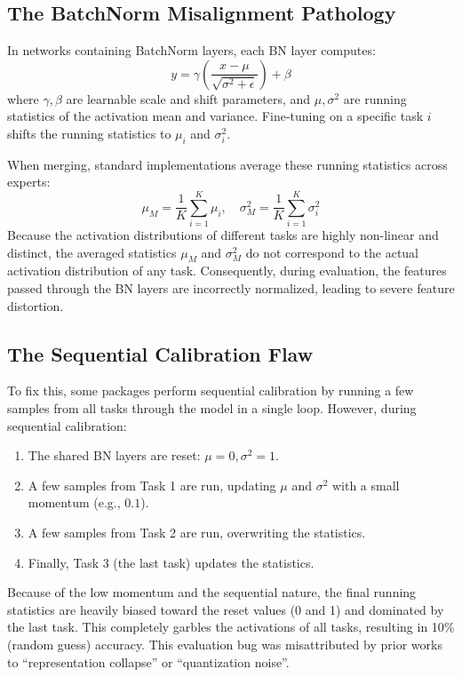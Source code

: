 \documentclass{article}
\theoremstyle{plain}
\theoremstyle{definition}
\theoremstyle{remark}
\begin{document}
\subsection{The BatchNorm Misalignment Pathology}
In networks containing BatchNorm layers, each BN layer computes:
\begin{equation}
    y = \gamma \left(\frac{x - \mu}{\sqrt{\sigma^2 + \epsilon}}\right) + \beta
\end{equation}
where $\gamma, \beta$ are learnable scale and shift parameters, and $\mu, \sigma^2$ are running statistics of the activation mean and variance. Fine-tuning on a specific task $i$ shifts the running statistics to $\mu_i$ and $\sigma^2_i$. 

When merging, standard implementations average these running statistics across experts:
\begin{equation}
    \mu_M = \frac{1}{K}\sum_{i=1}^K \mu_i, \quad \sigma^2_M = \frac{1}{K}\sum_{i=1}^K \sigma^2_i
\end{equation}
Because the activation distributions of different tasks are highly non-linear and distinct, the averaged statistics $\mu_M$ and $\sigma^2_M$ do not correspond to the actual activation distribution of any task. Consequently, during evaluation, the features passed through the BN layers are incorrectly normalized, leading to severe feature distortion.

\subsection{The Sequential Calibration Flaw}
To fix this, some packages perform sequential calibration by running a few samples from all tasks through the model in a single loop. However, during sequential calibration:
\begin{enumerate}
    \item The shared BN layers are reset: $\mu = 0, \sigma^2 = 1$.
    \item A few samples from Task 1 are run, updating $\mu$ and $\sigma^2$ with a small momentum (e.g., $0.1$).
    \item A few samples from Task 2 are run, overwriting the statistics.
    \item Finally, Task 3 (the last task) updates the statistics.
\end{enumerate}
Because of the low momentum and the sequential nature, the final running statistics are heavily biased toward the reset values (0 and 1) and dominated by the last task. This completely garbles the activations of all tasks, resulting in 10\% (random guess) accuracy. This evaluation bug was misattributed by prior works to ``representation collapse'' or ``quantization noise''.
\end{document}

